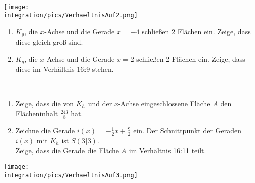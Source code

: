 \begin{Exercise}[title={\raggedright\normalfont Gegeben sind die Funktion \(g(x)=\frac{1}{6}x^3+\frac{1}{2}x^2\) und ihr Schaubild \(K_g\).}, label=verhaltnisFlaechenA2]\\
	\begin{minipage}{\textwidth}
		\begin{minipage}{.6\textwidth}
			\texttt{[image: \\integration/pics/VerhaeltnisAuf2.png]}
		\end{minipage}
		\begin{minipage}{.4\textwidth}\raggedright
			\begin{enumerate}[label=\alph*)]
				\item \(K_g\), die \(x\)-Achse und die Gerade \(x=-4\) schließen 2 Flächen ein. Zeige, dass diese gleich groß sind.
				\item \(K_g\), die \(x\)-Achse und die Gerade \(x=2\) schließen 2 Flächen ein. Zeige, dass diese im Verhältnis 16:9 stehen.		
			\end{enumerate}
		\end{minipage}
	\end{minipage}
\end{Exercise}

\begin{Exercise}[title={\raggedright\normalfont Gegeben sind die Funktion \(h(x)=-\frac{1}{18}x^3+\frac{1}{2}x^2\) und ihr Schaubild \(K_h\).}, label=verhaltnisFlaechenA3]\\
	\begin{minipage}{\textwidth}
		\begin{minipage}{.4\textwidth}\raggedright
			\begin{enumerate}[label=\alph*)]
				\item Zeige, dass die von \(K_h\) und der \(x\)-Achse eingeschlossene Fläche \(A\) den Flächeninhalt \(\frac{243}{8}\) hat.
				\item Zeichne die Gerade \(i(x)=-\frac{1}{2}x+\frac{9}{2}\) ein. Der Schnittpunkt der Geraden \(i(x)\) mit \(K_h\) ist \(S(3\vert 3)\).\\
				Zeige, dass die Gerade die Fläche \(A\) im Verhältnis 16:11 teilt.					
			\end{enumerate}
		\end{minipage}
		\begin{minipage}{.6\textwidth}
			\texttt{[image: \\integration/pics/VerhaeltnisAuf3.png]}
		\end{minipage}
	\end{minipage}
\end{Exercise}

